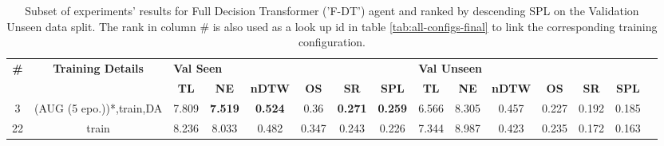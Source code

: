 \begin{table}
\centering
\caption{\label{tab:f_dt_final}Subset of experiments' results for Full Decision Transformer ('F-DT') agent and ranked by descending SPL on the Validation Unseen data split. The rank in column \# is also used as a look up id in table \ref{tab:all-configs-final} to link the corresponding training configuration.}
\begin{tabular}{@{\hskip3pt}c@{\hskip3pt}c@{\hskip3pt}c@{\hskip3pt}c@{\hskip3pt}c@{\hskip3pt}c@{\hskip3pt}c@{\hskip3pt}c@{\hskip3pt}c@{\hskip3pt}c@{\hskip3pt}c@{\hskip3pt}c@{\hskip3pt}c@{\hskip3pt}c@{\hskip3pt}c}
\toprule
\textbf{\#} & \textbf{Training Details} & \multicolumn{6}{l}{\textbf{Val Seen}} & \multicolumn{6}{l}{\textbf{Val Unseen}} \\
 \textbf{~} &                \textbf{~} &       \textbf{TL} &     \textbf{NE} &   \textbf{nDTW} & \textbf{OS} &     \textbf{SR} &    \textbf{SPL} &         \textbf{TL} & \textbf{NE} & \textbf{nDTW} & \textbf{OS} & \textbf{SR} & \textbf{SPL} \\
\midrule
          3 &  (AUG (5 epo.))*,train,DA &             7.809 &  \textbf{7.519} &  \textbf{0.524} &        0.36 &  \textbf{0.271} &  \textbf{0.259} &               6.566 &       8.305 &         0.457 &       0.227 &       0.192 &        0.185 \\
         22 &                     train &             8.236 &           8.033 &           0.482 &       0.347 &           0.243 &           0.226 &               7.344 &       8.987 &         0.423 &       0.235 &       0.172 &        0.163 \\
\bottomrule
\end{tabular}
\end{table}
